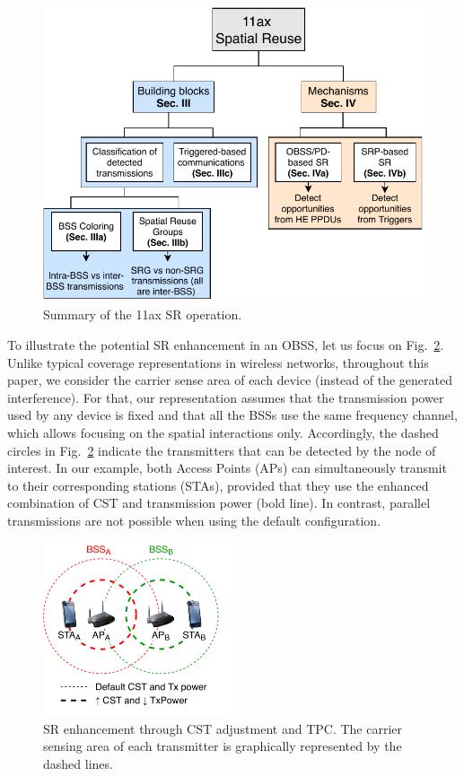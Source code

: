 \documentclass{article}
\begin{document}
\begin{figure}[ht!]
	\centering
	\includegraphics[width=0.7\columnwidth]{sr_summary}
	\caption{Summary of the 11ax SR operation.}
	\label{fig:sr_summary}
\end{figure}

To illustrate the potential SR enhancement in an OBSS, let us focus on Fig.~\ref{fig:spatial_reuse_11ax}. Unlike typical coverage representations in wireless networks, throughout this paper, we consider the carrier sense area of each device (instead of the generated interference). For that, our representation assumes that the transmission power used by any device is fixed and that all the BSSs use the same frequency channel, which allows focusing on the spatial interactions only. Accordingly, the dashed circles in Fig.~\ref{fig:spatial_reuse_11ax} indicate the transmitters that can be detected by the node of interest. In our example, both Access Points (APs) can simultaneously transmit to their corresponding stations (STAs), provided that they use the enhanced combination of CST and transmission power (bold line). In contrast, parallel transmissions are not possible when using the default configuration.
\begin{figure}[ht!]
	\centering
	\includegraphics[width=0.5\textwidth]{fig_1.pdf}
	\caption{SR enhancement through CST adjustment and TPC. The carrier sensing area of each transmitter is graphically represented by the dashed lines.}
	\label{fig:spatial_reuse_11ax}
\end{figure}
\end{document}
